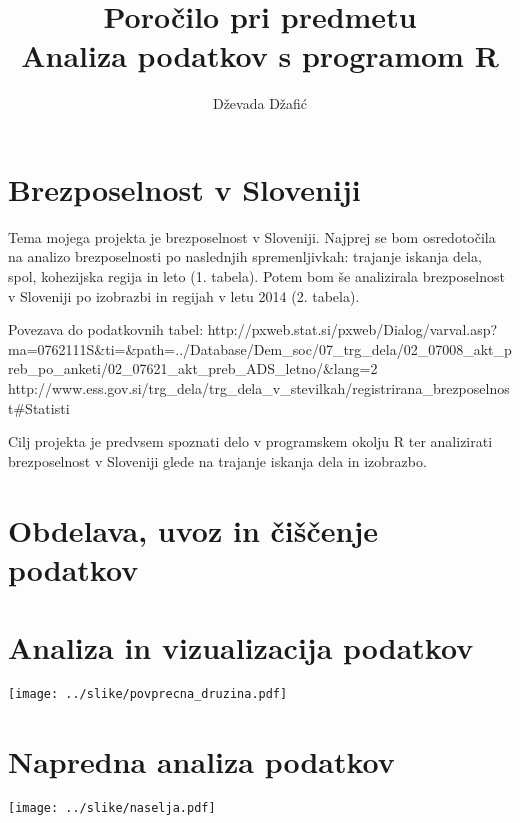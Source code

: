\documentclass[11pt,a4paper]{article}
\begin{document}
\title{Poročilo pri predmetu \\
Analiza podatkov s programom R}
\author{Dževada Džafić}
\maketitle

\section{Brezposelnost v Sloveniji}

Tema mojega projekta je brezposelnost v Sloveniji. Najprej se bom osredotočila na analizo brezposelnosti po naslednjih spremenljivkah: trajanje iskanja dela, spol, kohezijska regija in leto (1. tabela). Potem bom še analizirala brezposelnost v Sloveniji po izobrazbi in regijah v letu 2014 (2. tabela).

Povezava do podatkovnih tabel:
http://pxweb.stat.si/pxweb/Dialog/varval.asp?ma=0762111S&ti=&path=../Database/Dem_soc/07_trg_dela/02_07008_akt_preb_po_anketi/02_07621_akt_preb_ADS_letno/&lang=2
http://www.ess.gov.si/trg_dela/trg_dela_v_stevilkah/registrirana_brezposelnost#Statisti%

Cilj projekta je predvsem spoznati delo v programskem okolju R ter analizirati brezposelnost v Sloveniji glede na trajanje iskanja dela in izobrazbo.


\section{Obdelava, uvoz in čiščenje podatkov}

\section{Analiza in vizualizacija podatkov}

\texttt{[image: ../slike/povprecna\_druzina.pdf]}

\section{Napredna analiza podatkov}

\texttt{[image: ../slike/naselja.pdf]}
\end{document}
